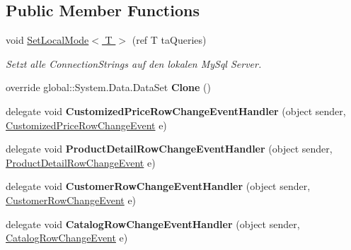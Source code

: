 \subsection*{Public Member Functions}
\begin{DoxyCompactItemize}
\item 
void \hyperlink{class_products_1_1_data_1_1ds_sage_a2bce30983971c94378855093afd23b68}{Set\+Local\+Mode$<$ T $>$} (ref T ta\+Queries)
\begin{DoxyCompactList}\small\item\em Setzt alle Connection\+Strings auf den lokalen My\+Sql Server. \end{DoxyCompactList}\item 
override global\+::\+System.\+Data.\+Data\+Set {\bfseries Clone} ()\hypertarget{class_products_1_1_data_1_1ds_sage_af5b98563e38bdb65bf565beebfe349bd}{}\label{class_products_1_1_data_1_1ds_sage_af5b98563e38bdb65bf565beebfe349bd}

\item 
delegate void {\bfseries Customized\+Price\+Row\+Change\+Event\+Handler} (object sender, \hyperlink{class_products_1_1_data_1_1ds_sage_1_1_customized_price_row_change_event}{Customized\+Price\+Row\+Change\+Event} e)\hypertarget{class_products_1_1_data_1_1ds_sage_a521c07c5288d53cba4595a1833870077}{}\label{class_products_1_1_data_1_1ds_sage_a521c07c5288d53cba4595a1833870077}

\item 
delegate void {\bfseries Product\+Detail\+Row\+Change\+Event\+Handler} (object sender, \hyperlink{class_products_1_1_data_1_1ds_sage_1_1_product_detail_row_change_event}{Product\+Detail\+Row\+Change\+Event} e)\hypertarget{class_products_1_1_data_1_1ds_sage_ae544583404b36d8d395406a86f33ee25}{}\label{class_products_1_1_data_1_1ds_sage_ae544583404b36d8d395406a86f33ee25}

\item 
delegate void {\bfseries Customer\+Row\+Change\+Event\+Handler} (object sender, \hyperlink{class_products_1_1_data_1_1ds_sage_1_1_customer_row_change_event}{Customer\+Row\+Change\+Event} e)\hypertarget{class_products_1_1_data_1_1ds_sage_a94035a1c39e1287542e9a83ce34d41d6}{}\label{class_products_1_1_data_1_1ds_sage_a94035a1c39e1287542e9a83ce34d41d6}

\item 
delegate void {\bfseries Catalog\+Row\+Change\+Event\+Handler} (object sender, \hyperlink{class_products_1_1_data_1_1ds_sage_1_1_catalog_row_change_event}{Catalog\+Row\+Change\+Event} e)\hypertarget{class_products_1_1_data_1_1ds_sage_a2e248d87276fdb92d701057a8fbc601e}{}\label{class_products_1_1_data_1_1ds_sage_a2e248d87276fdb92d701057a8fbc601e}


\end{DoxyCompactItemize}
